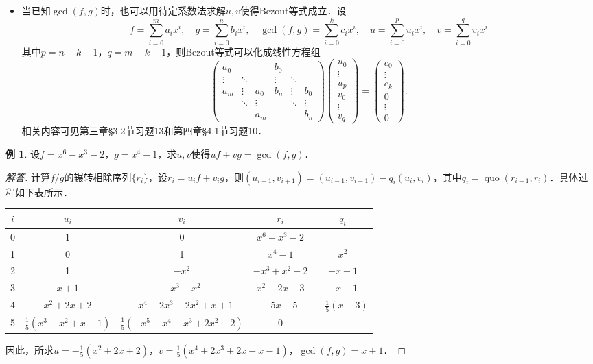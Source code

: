 \documentclass[a4paper,fontset=windows]{ctexbook}
\theoremstyle{definition}
\newtheorem{example}{例}[chapter]
\DeclareMathOperator{\quo}{quo}
\begin{document}
\begin{itemize}
\item 当已知$\gcd(f,g)$时，也可以用待定系数法求解$u,v$使得Bezout等式成立．设
$$f=\sum_{i=0}^ma_ix^i,\quad g=\sum_{i=0}^nb_ix^i,\quad\gcd(f,g)=\sum_{i=0}^kc_ix^i,\quad u=\sum_{i=0}^pu_ix^i,\quad v=\sum_{i=0}^qv_ix^i$$
其中$p=n-k-1$，$q=m-k-1$，则Bezout等式可以化成线性方程组
$$\begin{pmatrix}a_0&&&b_0&& \\ \vdots&\ddots&&\vdots&\ddots& \\ a_m&\vdots&a_0&b_n&\vdots&b_0 \\ &\ddots&\vdots&&\ddots&\vdots \\ &&a_m&&&b_n\end{pmatrix}\begin{pmatrix}u_0 \\ \vdots \\ u_p \\ v_0 \\ \vdots \\ v_q\end{pmatrix}=\begin{pmatrix}c_0 \\ \vdots \\ c_k \\ 0 \\ \vdots \\ 0\end{pmatrix}.$$
相关内容可见第三章\S 3.2节习题13和第四章\S 4.1节习题10．
\end{itemize}

\begin{example}
设$f=x^6-x^3-2$，$g=x^4-1$，求$u,v$使得$uf+vg=\gcd(f,g)$．
\end{example}

\begin{proof}[解答]
计算$f/g$的辗转相除序列$\{r_i\}$，设$r_i=u_if+v_ig$，则$(u_{i+1},v_{i+1})=(u_{i-1},v_{i-1})-q_i(u_i,v_i)$，其中$q_i=\quo(r_{i-1},r_i)$．具体过程如下表所示．
\begin{center}\begin{tabular}{|c|c|c|c|c|}
\hline $i$ & $u_i$ & $v_i$ & $r_i$ & $q_i$ \\
\hline 0 & 1 & 0 & $x^6-x^3-2$ & \\
\hline 1 & 0 & 1 & $x^4-1$ & $x^2$ \\
\hline 2 & 1 & $-x^2$ & $-x^3+x^2-2$ & $-x-1$ \\
\hline 3 & $x+1$ & $-x^3-x^2$ & $x^2-2x-3$ & $-x-1$ \\
\hline 4 & $x^2+2x+2$ & $-x^4-2x^3-2x^2+x+1$ & $-5x-5$ & $-\frac{1}{5}(x-3)$ \\
\hline 5 & $\frac{1}{5}(x^3-x^2+x-1)$ & $\frac{1}{5}(-x^5+x^4-x^3+2x^2-2)$ & 0 & \\ \hline
\end{tabular}\end{center}
因此，所求$u=-\frac{1}{5}(x^2+2x+2)$，$v=\frac{1}{5}(x^4+2x^3+2x-x-1)$，$\gcd(f,g)=x+1$．
\end{proof}
\end{document}
